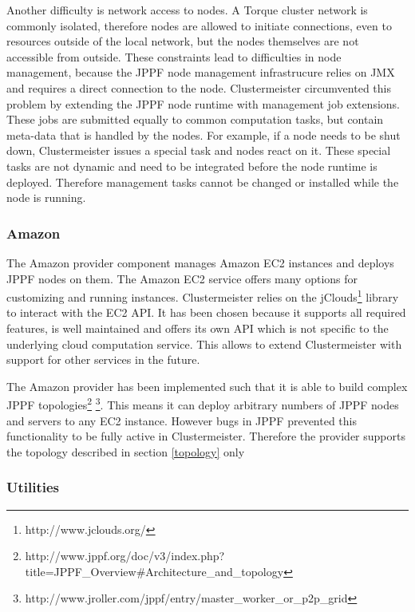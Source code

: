 \documentclass[12pt]{article}
\begin{document}
Another difficulty is network access to nodes. A Torque cluster network is commonly isolated, therefore nodes are allowed to initiate connections, even to resources outside of the local network, but the nodes themselves are not accessible from outside. These constraints lead to difficulties in node management, because the JPPF node management infrastrucure relies on JMX and requires a direct connection to the node. Clustermeister circumvented this problem by extending the JPPF node runtime with management job extensions. These jobs are submitted equally to common computation tasks, but contain meta-data that is handled by the nodes. For example, if a node needs to be shut down, Clustermeister issues a special task and nodes react on it. These special tasks are not dynamic and need to be integrated before the node runtime is deployed. Therefore management tasks cannot be changed or installed while the node is running.

\subsubsection{Amazon}
The Amazon provider component manages Amazon EC2 instances and deploys JPPF nodes on them. The Amazon EC2 service offers many options for customizing and running instances. Clustermeister relies on the jClouds\footnote{http://www.jclouds.org/} library to interact with the EC2 API. It has been chosen because it supports all required features, is well maintained and offers its own API which is not specific to the underlying cloud computation service. This allows to extend Clustermeister with support for other services in the future.

The Amazon provider has been implemented such that it is able to build complex JPPF topologies\footnote{http://www.jppf.org/doc/v3/index.php?title=JPPF\_Overview\#Architecture\_and\_topology} \footnote{http://www.jroller.com/jppf/entry/master\_worker\_or\_p2p\_grid}. This means it can deploy arbitrary numbers of JPPF nodes and servers to any EC2 instance. However bugs in JPPF prevented this functionality to be fully active in Clustermeister. Therefore the provider supports the topology described in section \ref{topology} only

\subsubsection{Utilities}
\end{document}
